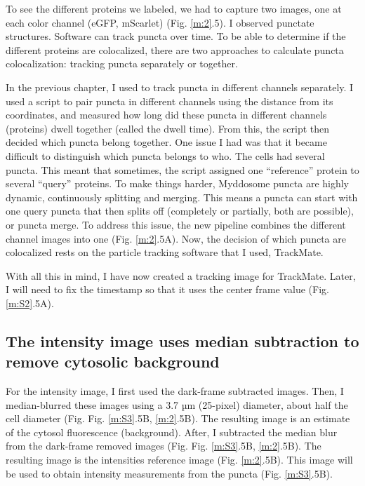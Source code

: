 To see the different proteins we labeled, we had to capture two images, one at each color channel (eGFP, mScarlet) (Fig. \ref{m:2}.5). I observed punctate structures. Software can track puncta over time. To be able to determine if the different proteins are colocalized, there are two approaches to calculate puncta colocalization: tracking puncta separately or together.

In the previous chapter, I used to track puncta in different channels separately. I used a script to pair puncta in different channels using the distance from its coordinates, and measured how long did these puncta in different channels (proteins) dwell together (called the dwell time). From this, the script then decided which puncta belong together. One issue I had was that it became difficult to distinguish which puncta belongs to who. The cells had several puncta. This meant that sometimes, the script assigned one “reference” protein to several “query” proteins. To make things harder, Myddosome puncta are highly dynamic, continuously splitting and merging. This means a puncta can start with one query puncta that then splits off (completely or partially, both are possible), or puncta merge. To address this issue, the new pipeline combines the different channel images into one (Fig. \ref{m:2}.5A). Now, the decision of which puncta are colocalized rests on the particle tracking software that I used, TrackMate.

With all this in mind, I have now created a tracking image for TrackMate. Later, I will need to fix the timestamp so that it uses the center frame value (Fig. \ref{m:S2}.5A).

\subsection{The intensity image uses median subtraction to remove cytosolic background}
For the intensity image, I first used the dark-frame subtracted images. Then, I median-blurred these images using a 3.7 µm (25-pixel) diameter, about half the cell diameter (Fig. Fig. \ref{m:S3}.5B, \ref{m:2}.5B). The resulting image is an estimate of the cytosol fluorescence (background). After, I subtracted the median blur from the dark-frame removed images (Fig. Fig. \ref{m:S3}.5B, \ref{m:2}.5B). The resulting image is the intensities reference image (Fig. \ref{m:2}.5B). This image will be used to obtain intensity measurements from the puncta (Fig. \ref{m:S3}.5B).

